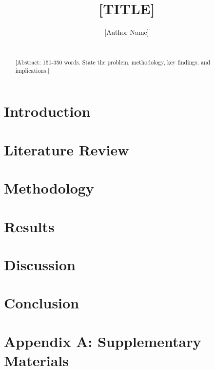 \documentclass[12pt]{article}
\title{[TITLE]}
\author{[Author Name] \\ [Department] \\ [University]}
\date{}
\begin{document}
\maketitle

\begin{abstract}
[Abstract: 150-350 words. State the problem, methodology, key findings, and implications.]
\end{abstract}

\tableofcontents
\newpage

\section{Introduction}

\section{Literature Review}

\section{Methodology}

\section{Results}

\section{Discussion}

\section{Conclusion}




\appendix
\section{Appendix A: Supplementary Materials}
\end{document}
